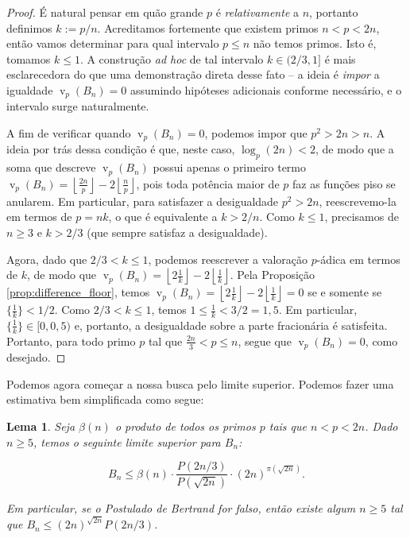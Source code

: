 \documentclass[11pt]{article}
\newtheorem{lemma}[theorem]{Lema}
\theoremstyle{remark}
\newcommand{\floor}[1]{\left\lfloor #1 \right\rfloor}
\newcommand{\vs}{\vspace{10px}}
\DeclareMathOperator{\val}{v}
\begin{document}
\begin{proof}

É natural pensar em quão grande $p$ é \textit{relativamente} a $n$, portanto definimos $k:= p/n$. Acreditamos fortemente que existem primos $n < p < 2n$, então vamos determinar para qual intervalo $p\le n$ não temos primos. Isto é, tomamos $k\le 1$. A construção \textit{ad hoc} de tal intervalo $k\in (2/3, 1]$ é mais esclarecedora do que uma demonstração direta desse fato -- a ideia é \textit{impor} a igualdade $\val_p(B_n)= 0$ assumindo hipóteses adicionais conforme necessário, e o intervalo surge naturalmente.
\vs

A fim de verificar quando $\val_p(B_n)=0$, podemos impor que $p^2>2n>n$. A ideia por trás dessa condição é que, neste caso, $\log_p(2n)< 2$, de modo que a soma que descreve $\val_p(B_n)$ possui apenas o primeiro termo $\val_p(B_n) = \floor{\frac{2n}{p}}-2\floor{\frac{n}{p}}$, pois toda potência maior de $p$ faz as funções piso se anularem. Em particular, para satisfazer a desigualdade $p^2>2n$, reescrevemo-la em termos de $p=nk$, o que é equivalente a $k>2/n$. Como $k\le 1$, precisamos de $n\ge 3$ e $k>2/3$ (que sempre satisfaz a desigualdade).
\vs

Agora, dado que $2/3<k\le 1$, podemos reescrever a valoração $p$-ádica em termos de $k$, de modo que $\val_p(B_n)=\floor{2\frac 1k}-2\floor{\frac 1k}$. Pela Proposição \ref{prop:difference_floor}, temos $\val_p(B_n)=\floor{2\frac1k}-2\floor{\frac1k}= 0$ se e somente se $\{\frac1k\}<1/2$. Como $2/3<k\le 1$, temos $1\le \frac1k<3/2 = 1{,}5$. Em particular, $\{\frac 1k\}\in [0,0{,}5)$ e, portanto, a desigualdade sobre a parte fracionária é satisfeita. Portanto, para todo primo $p$ tal que $\frac{2n}3<p\le n$, segue que $\val_p(B_n) = 0$, como desejado.
\end{proof}
\vs

Podemos agora começar a nossa busca pelo limite superior. Podemos fazer uma estimativa bem simplificada como segue:

\begin{lemma} \label{lemma:upper_bound_bn}
    Seja $\beta(n)$ o produto de todos os primos $p$ tais que $n<p<2n$. Dado $n\ge 5$, temos o seguinte limite superior para $B_n$: 

    \[B_n\le \beta(n)\cdot \frac{P(2n/3)}{P(\sqrt{2n})}\cdot  (2n)^{\pi(\sqrt{2n})}.\]

    Em particular, se o Postulado de Bertrand for falso, então existe algum $n\ge 5$ tal que $B_n\le (2n)^{\sqrt{2n}}P(2n/3)$.
\end{lemma}\vs
\end{document}
